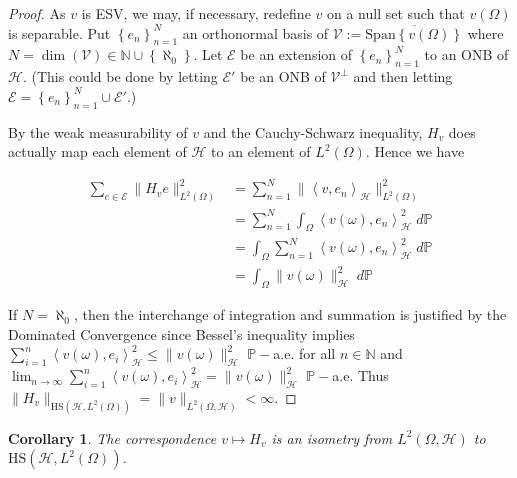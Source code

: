 \documentclass{article}
\numberwithin{theorem}{section}
\numberwithin{lemma}{section}
\numberwithin{definition}{section}
\numberwithin{assumption}{section}
\numberwithin{proposition}{section}
\numberwithin{remark}{section}
\newtheorem{corollary}{Corollary}
\numberwithin{corollary}{section}
\numberwithin{conjecture}{section}
\numberwithin{example}{section}
\newcommand{\N}{\mathbb{N}}
\newcommand{\bset}[1]{\left \lbrace #1 \right \rbrace}
\newcommand{\aset}[1]{\left \langle #1 \right \rangle}
\newcommand{\Span}[1]{\mathrm{Span}\bset{#1}}
\newcommand{\D}{\displaystyle}
\newcommand{\intp}[1] {\D \int_\Omega {#1 } \; d \mathbb P}
\newcommand{\HS}{\mathrm{HS}}
\newcommand{\CH}{\mathcal H}
\begin{document}
\begin{multicols*}{2}
\begin{proof}
    As $v$ is ESV, we may, if necessary, redefine $v$ on a null set such that $v(\Omega)$ is separable. Put $\bset{e_n}_{n=1}^N$ an orthonormal basis of $\mathcal V := \overline{\Span{v(\Omega)}}$ where $N = \dim(\mathcal V) \in \N \cup \bset{\aleph_0}$. Let $\mathscr E$ be an extension of $\bset{e_n}_{n=1}^N$ to an ONB of $\mathcal H$. (This could be done by letting $\mathscr E'$ be an ONB of $\mathcal V^\perp$ and then letting $\mathscr E = \bset{e_n}_{n=1}^N \cup \mathscr E'$.)

   By the weak measurability of $v$ and the Cauchy-Schwarz inequality, $H_v$ does actually map each element of $\mathcal H$ to an element of $L^2(\Omega)$. Hence we have

   \begin{align*}
       \sum_{e \in \mathscr E} \|H_ve\|_{L^2(\Omega)}^2
       &= 
       \sum_{n=1}^N \|\aset{v, e_n}_\mathcal H\|^2_{L^2(\Omega)}
       \\&= 
        \sum_{n=1}^N \intp{\aset{v(\omega), e_n}^2_\mathcal H}
        \\&= 
        \intp{\sum_{n=1}^N \aset{v(\omega), e_n}^2_\mathcal H}
         \\&= 
        \intp{ \|v(\omega)\|^2_\mathcal H}
   \end{align*}
   
  If $N = \aleph_0$, then the interchange of integration and summation is justified by the Dominated Convergence since Bessel's inequality implies $\sum_{i=1}^n \aset{v(\omega), e_i}_\mathcal H^2 \leq \|v(\omega)\|^2_\mathcal H$ $\mathbb P-$a.e. for all $n \in \N$ and $\lim_{n \to \infty} \sum_{i=1}^n \aset{v(\omega), e_i}_\mathcal H^2 = \|v(\omega)\|^2_\mathcal H$ $\mathbb P-$a.e. Thus $\|H_v\|_{\HS(\mathcal H, L^2(\Omega))} = \|v\|_{L^2(\Omega, \CH)} < \infty$. 
\end{proof}

\begin{corollary} \label{Bochner norm equals HS norm equals sum of svsq}
    The correspondence $v \mapsto H_v$ is an isometry from $L^2(\Omega, \CH)$ to $\mathrm{HS}(\CH, L^2(\Omega))$. %
\end{corollary}

\end{multicols*}
\end{document}
